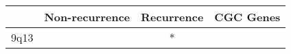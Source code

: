 \begin{tabular}{lccr}
\toprule
{} & Non-recurrence & Recurrence & CGC Genes \\
\midrule
9q13 &                &          * &           \\
\bottomrule
\end{tabular}

